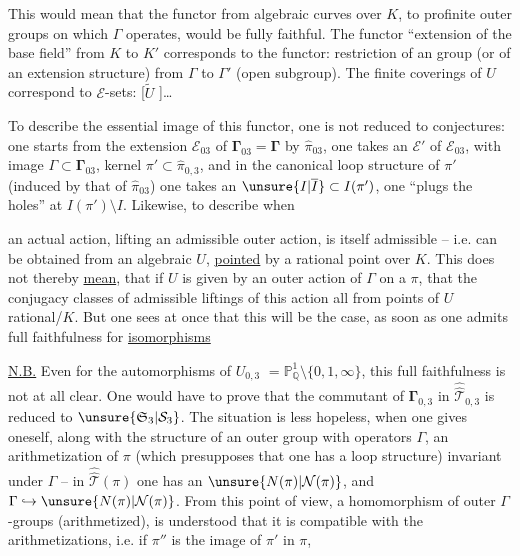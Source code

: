 This would mean that the functor from algebraic
curves over $K$, to profinite outer groups
on which $\Gamma$ operates, would be fully faithful.
The functor ``extension of the base field'' from
$K$ to $K'$ corresponds to the functor: restriction
of an  group (or of an extension
structure) from $\Gamma$ to $\Gamma'$ (open subgroup).
The finite  coverings of $U$ correspond to
$\mathcal E$-sets: [$\widetilde U$ ]\ldots

To describe the essential image of this
functor, one is not reduced to conjectures:
one starts from the  extension $\mathcal E_{03}$ of $\boldsymbol{\Gamma}_{03}=\boldsymbol{\Gamma}$
by $\widehat{\pi}_{03}$, one takes an   $\mathcal E'$
of $\mathcal E_{03}$, with image $\Gamma\subset\boldsymbol{\Gamma}_{03}$, kernel
$\pi'\subset\widehat{\pi}_{0,3}$, and in the canonical loop structure
of $\pi'$ (induced by that of $\widehat{\pi}_{03}$)
one takes an $\unsure{I|\overline I}\subset I(\pi')$,  one ``plugs the holes''
at $I(\pi')\setminus I$. Likewise, to describe when

an actual action, lifting an admissible outer
action, is itself admissible -- 
i.e. can be obtained from an algebraic 
$U$, \uline{pointed} by a rational point over $K$.
This does not thereby \uline{mean}, that if
$U$ is given by an outer action of $\Gamma$ on a $\pi$,
that the conjugacy classes of admissible liftings
of this action  all from
points of $U$ rational/$K$. But one sees at once that
this will be the case, as soon as one admits
full faithfulness for \uline{isomorphisms}

\uline{N.B.} Even for the automorphisms of $U_{0,3}$
$=\mathbb P^1_{\mathbb Q}\setminus\{0,1,\infty\}$, this full faithfulness is not
at all clear. One would have to prove that 
the commutant of $\boldsymbol{\Gamma}_{0,3}$ in $\widehat{\widehat{\mathcal T}}_{0,3}$ is reduced
to $\unsure{\mathfrak S_3|\mathcal S_3}$. The situation is less hopeless,
when one gives oneself, along with the structure of
an outer  group with operators $\Gamma$, an arithmetization
of $\pi$ (which presupposes that one has 
a loop structure) invariant under  $\Gamma$
--  in $\widehat{\widehat{\mathcal T}}(\pi)$ one has an $\unsure{N(\pi)|\mathcal N(\pi)}$,
and $\Gamma\hookrightarrow\unsure{N(\pi)|\mathcal N(\pi)}$. From this point of view,  a
homomorphism  of outer $\Gamma$-groups (arithmetized),
 is understood that it is compatible with
the arithmetizations, i.e. if $\pi''$ is the image of $\pi'$ in $\pi$,

